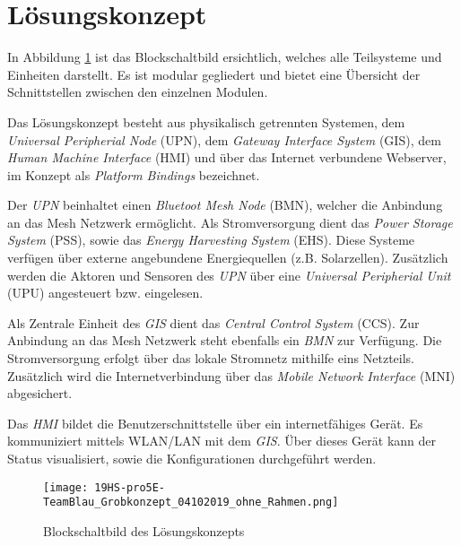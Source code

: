 \clearpage
\section{Lösungskonzept}\label{sec:Loesungskonzept}
In Abbildung \ref{img:Grobkonzept} ist das Blockschaltbild ersichtlich, welches alle Teilsysteme und Einheiten darstellt. Es ist modular gegliedert und bietet eine Übersicht der Schnittstellen zwischen den einzelnen Modulen. 

Das Lösungskonzept besteht aus physikalisch getrennten Systemen, dem \textit{Universal Peripherial Node} (UPN), dem \textit{Gateway Interface System} (GIS), dem \textit{Human Machine Interface} (HMI) und über das Internet verbundene Webserver, im Konzept als \textit{Platform Bindings} bezeichnet.  

Der \textit{UPN} beinhaltet einen \textit{Bluetoot Mesh Node} (BMN), welcher die Anbindung an das Mesh Netzwerk ermöglicht. Als Stromversorgung dient das \textit{Power Storage System} (PSS), sowie das \textit{Energy Harvesting System} (EHS). Diese Systeme verfügen über externe angebundene Energiequellen (z.B. Solarzellen). Zusätzlich werden die Aktoren und Sensoren des \textit{UPN} über eine \textit{Universal Peripherial Unit} (UPU) angesteuert bzw. eingelesen.

Als Zentrale Einheit des \textit{GIS} dient das \textit{Central Control System} (CCS). Zur Anbindung an das Mesh Netzwerk steht ebenfalls ein \textit{BMN} zur Verfügung. Die Stromversorgung erfolgt über das lokale Stromnetz mithilfe eins Netzteils. Zusätzlich wird die Internetverbindung über das \textit{Mobile Network Interface} (MNI) abgesichert. 

Das \textit{HMI} bildet die Benutzerschnittstelle über ein internetfähiges Gerät. Es kommuniziert mittels WLAN/LAN mit dem \textit{GIS}. Über dieses Gerät kann der Status visualisiert, sowie die Konfigurationen durchgeführt werden.



\begin{figure}
	\centering
	\texttt{[image: 19HS-pro5E-TeamBlau\_Grobkonzept\_04102019\_ohne\_Rahmen.png]}
	\caption{Blockschaltbild des Lösungskonzepts}
	\label{img:Grobkonzept}
\end{figure} 









